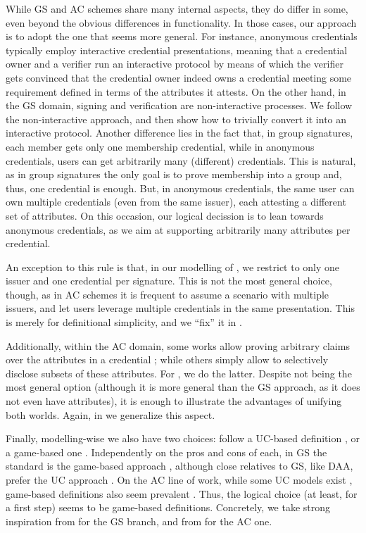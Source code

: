 While GS and AC schemes share many internal aspects, they do differ in some,
even beyond the obvious differences in functionality. In those cases, our
approach is to adopt the one that seems more general.
%
For instance,
anonymous credentials typically employ interactive credential presentations,
meaning that a credential owner and a verifier run an interactive
protocol by means of which the verifier gets convinced that the credential owner
indeed owns a credential meeting some requirement defined in terms of the
attributes it attests. On the other hand, in the GS domain, signing and
verification are non-interactive processes. We follow the non-interactive
approach, and then show how to trivially convert it into an interactive
protocol.
%
Another difference lies in the fact that, in group signatures, each member gets
only one membership credential, while in anonymous credentials, users can get
arbitrarily many (different) credentials. This is natural, as in group
signatures the only goal is to prove membership into a group and, thus, one
credential is enough. But, in anonymous credentials, the same user can own
multiple credentials (even from the same issuer), each attesting a different
set of attributes. On this occasion, our logical decission is to lean towards
anonymous credentials, as we aim at supporting arbitrarily many attributes per
credential.

An exception to this rule is that, in our modelling of \GSAC, we restrict to
only one issuer and one credential per signature. This is not the most general
choice, though, as in AC schemes it is frequent to assume a scenario with
multiple issuers, and let users leverage multiple credentials in the same
presentation. This is merely for definitional simplicity, and we ``fix'' it
in \UAS.

Additionally, within the AC domain, some works allow proving arbitrary claims
over the attributes in a credential \cite{bcc+09,cklm14,dmm+18,fhs19}; while
others simply allow to
selectively disclose subsets of these attributes. For \GSAC, we do the latter.
Despite not being the most general option (although it is more general than the
GS approach, as it does not even have attributes), it is enough to illustrate
the advantages of unifying both worlds. Again, in \UAS we generalize this
aspect.

Finally, modelling-wise we also have two choices: follow a UC-based definition
\cite{cane20}, or a game-based one \cite{shoup04}. Independently on the pros and
cons of each, in GS the standard is the game-based approach
\cite{bmw03,bsz05,bcc+16,kty04,ky05}, although close relatives to GS, like DAA,
prefer the UC approach \cite{cdl16,cdl16b,ccd+17,cdl17}. On the AC line of work,
while some UC models exist \cite{}, game-based definitions also seem prevalent
\cite{bcc+09,cks10,cl11,cklm12,cmz14,dmm+18,fhs19}.
Thus, the logical choice (at least, for a first step) seems to be game-based
definitions. Concretely, we take strong inspiration from \cite{bsz05} for the
GS branch, and from \cite{fhs19} for the AC one.

